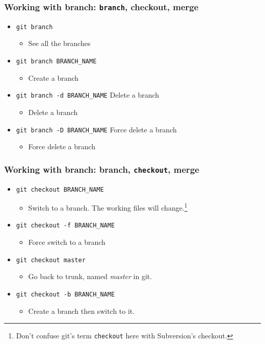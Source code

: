 \documentclass[11pt,ignorenonframetext,]{beamer}
\begin{document}
\begin{frame}[fragile]\frametitle{Working with \textbf{branch}:
\texttt{branch}, checkout, merge}

\begin{itemize}
\item
  \texttt{git branch} 
   \begin{itemize}
	   \item See all the branches
   \end{itemize}
\item
  \texttt{git branch BRANCH\_NAME} 
   \begin{itemize}
   \item
     Create a branch
   \end{itemize}
\item
  \texttt{git branch -d BRANCH\_NAME} Delete a branch
   \begin{itemize}
   \item
     Delete a branch
   \end{itemize}
\item
  \texttt{git branch -D BRANCH\_NAME} Force delete a branch
   \begin{itemize}
   \item
     Force delete a branch
   \end{itemize}
\end{itemize}
\end{frame}

\begin{frame}[fragile]\frametitle{Working with \textbf{branch}: branch,
\texttt{checkout}, merge}

\begin{itemize}
\item
  \texttt{git checkout BRANCH\_NAME} 
   \begin{itemize}
   \item
     Switch to a branch. The working files will change.\footnote{Don't
       confuse git's term \texttt{checkout} here with Subversion's
       checkout.}
   \end{itemize}
\item
  \texttt{git checkout -f BRANCH\_NAME} 
   \begin{itemize}
   \item
     Force switch to a branch
   \end{itemize}
\item
  \texttt{git checkout master}
   \begin{itemize}
   \item
     Go back to trunk, named \emph{master} in git.
   \end{itemize}
\item
  \texttt{git checkout -b BRANCH\_NAME} 
   \begin{itemize}
   \item
     Create a branch then switch to it.
   \end{itemize}
\end{itemize}
\end{frame}
\end{document}
